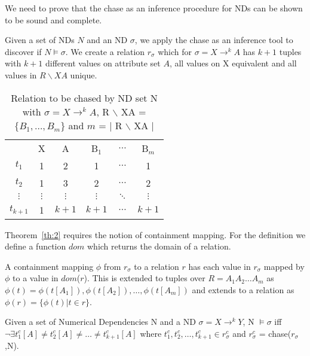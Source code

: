 We need to prove that the chase as an inference procedure for NDs can be shown
to be sound and complete. 

Given a set of NDs $N$ and an ND $\sigma$, we apply the chase as an
inference tool to discover if $N \models \sigma$. 
We create a relation $r_\sigma$ which for $\sigma = X \to^k
A$ has $k+1$ tuples with $k+1$ different values on attribute set $A$,
all values on X equivalent and all values in $R \backslash XA$ unique.

{\line
\begin{table}[ht]
\begin{center}
\begin{tabular}{c|c|c|c|c|c|} \cline{2-6}
 	& X 	& A 	& B$_1$ & $\ldots$ 	& B$_m$ \\ \cline{2-6}
$t_1$ 	& 1  	&  2  	& 1 	& $\ldots$ 	& 1 \\
$t_2$ 	& 1  	&  3  	& 2 	&  $\ldots$ 	& 2 \\
$\vdots$ & $\vdots$  &  $\vdots$  & $\vdots$ & $\ddots$ & $\vdots$ \\
$t_{k+1}$ & 1  &  $k+1$  & $k+1$ & $\ldots$ 	& $k+1$ \\ \cline{2-6}
\end{tabular}
\end{center}
\caption{\label{tbl:rel_chase1} Relation to be chased by ND set N with
$\sigma = X \to^k A$, R $\backslash$ XA = $\{ B_1, \ldots, B_m \}$
and $m$ = $|$ R $\backslash$ XA $|$}
\end{table}}

Theorem~\ref{th:2} requires the notion of containment mapping.
For the definition we define a function $dom$ which returns the domain
of a relation.

\begin{definition}\label{def:cm}
\begin{rm}
A containment mapping $\phi$ from $r_\sigma$ to a relation $r$ has
each value in $r_\sigma$ mapped by $\phi$ to a value in $dom$($r$).
This is extended to tuples over $R = A_1A_2 \ldots A_m$ as $\phi(t) =
\phi(t[A_1]),\phi(t[A_2]),\ldots, \phi(t[A_m])$ and extends to a
relation as $\phi(r) = \{ \phi(t) | t \in r \}$.
\end{rm}
\end{definition}

\begin{theorem}\label{th:2}
\begin{rm}
Given a set of Numerical Dependencies N and a ND $\sigma = X \to^k Y$,
N $\models \sigma$ iff $\neg\exists t^c_1[A] \not= t^c_2[A] \not= \ldots
\not= t^c_{k+1}[A]$ where $t^c_1,t^c_2,\ldots,t^c_{k+1} \in
r_\sigma^c$ and $r_\sigma^c$ = chase($r_\sigma$,N).
\end{rm}
\end{theorem}

